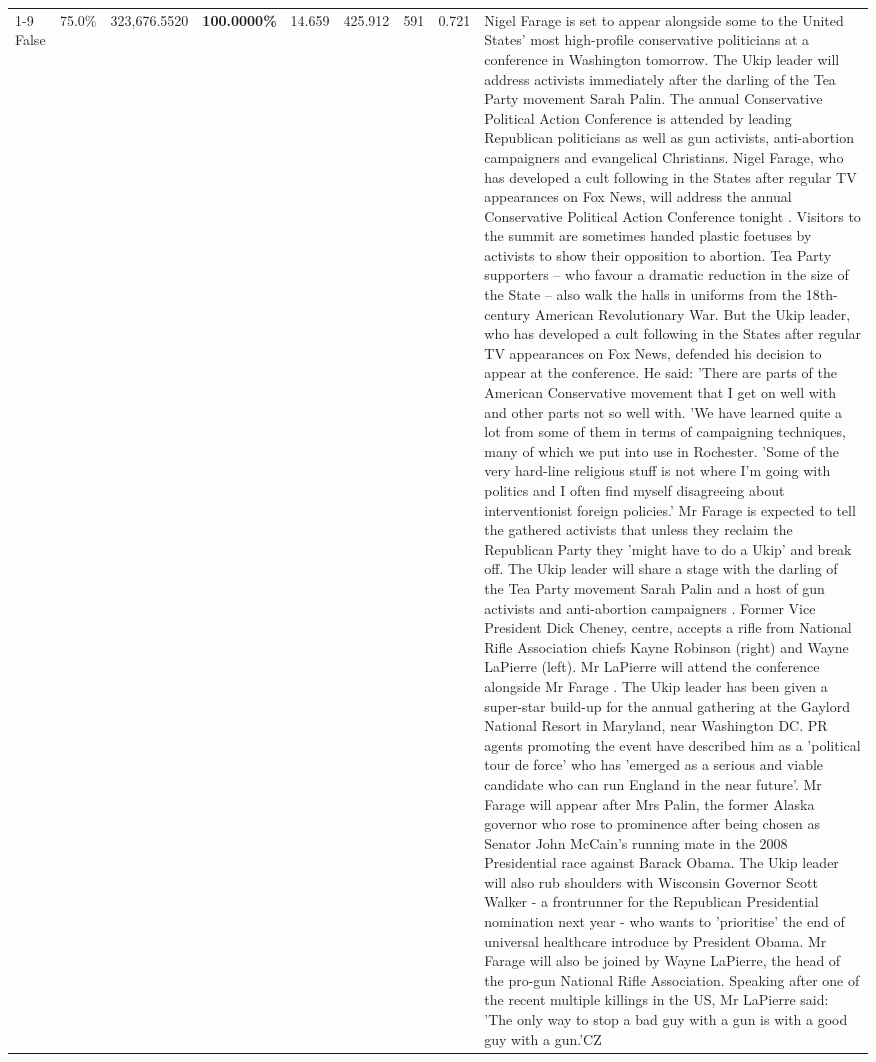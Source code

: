 \begin{table}[H]
\begin{tabular}{lllrlllll}
\cline{1-9}
False & 75.0\% & 323,676.5520 & \bfseries \color{red} 100.0000\% & 14.659 & 425.912 & 591 & 0.721 & Nigel Farage is set to appear alongside some to the United States' most high-profile conservative politicians at a conference in Washington tomorrow. The Ukip leader will address activists immediately after the darling of the Tea Party movement Sarah Palin. The annual Conservative Political Action Conference is attended by leading Republican politicians as well as gun activists, anti-abortion campaigners and evangelical Christians. Nigel Farage, who has developed a cult following in the States after regular TV appearances on Fox News, will address the annual Conservative Political Action Conference tonight . Visitors to the summit are sometimes handed plastic foetuses by activists to show their opposition to abortion. Tea Party supporters – who favour a dramatic reduction in the size of the State – also walk the halls in uniforms from the 18th-century American Revolutionary War. But the Ukip leader, who has developed a cult following in the States after regular TV appearances on Fox News, defended his decision to appear at the conference. He said: 'There are parts of the American Conservative movement that I get on well with and other parts not so well with. 'We have learned quite a lot from some of them in terms of campaigning techniques, many of which we put into use in Rochester. 'Some of the very hard-line religious stuff is not where I'm going with politics and I often find myself disagreeing about interventionist foreign policies.' Mr Farage is expected to tell the gathered activists that unless they reclaim the Republican Party they 'might have to do a Ukip' and break off. The Ukip leader will share a stage with the darling of the Tea Party movement Sarah Palin and a host of gun activists and anti-abortion campaigners . Former Vice President Dick Cheney, centre, accepts a rifle from National Rifle Association chiefs Kayne Robinson (right) and Wayne LaPierre (left). Mr LaPierre will attend the conference alongside Mr Farage . The Ukip leader has been given a super-star build-up for the annual gathering at the Gaylord National Resort in Maryland, near Washington DC. PR agents promoting the event have described him as a 'political tour de force' who has 'emerged as a serious and viable candidate who can run England in the near future'. Mr Farage will appear after Mrs Palin, the former Alaska governor who rose to prominence after being chosen as Senator John McCain's running mate in the 2008 Presidential race against Barack Obama. The Ukip leader will also rub shoulders with Wisconsin Governor Scott Walker - a frontrunner for the Republican Presidential nomination next year - who wants to 'prioritise' the end of universal healthcare introduce by President Obama. Mr Farage will also be joined by Wayne LaPierre, the head of the pro-gun National Rifle Association. Speaking after one of the recent multiple killings in the US, Mr LaPierre said: 'The only way to stop a bad guy with a gun is with a good guy with a gun.'CZ \\

\end{tabular}
\end{table}
